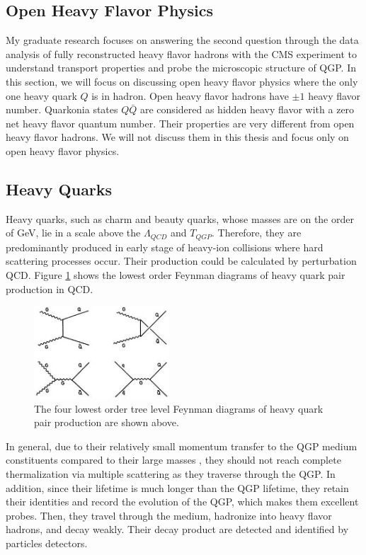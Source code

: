 \subsection{Open Heavy Flavor Physics}

My graduate research focuses on answering the second question through the data analysis of fully reconstructed heavy flavor hadrons with the CMS experiment to understand transport properties and probe the microscopic structure of QGP. In this section, we will focus on discussing open heavy flavor physics where the only one heavy quark $Q$ is in hadron. Open heavy flavor hadrons have $\pm 1$ heavy flavor number. Quarkonia states $Q\bar Q$ are considered as hidden heavy flavor with a zero net heavy flavor quantum number. Their properties are very different from open heavy flavor hadrons. We will not discuss them in this thesis and focus only on open heavy flavor physics. 

\subsection{Heavy Quarks}

Heavy quarks, such as charm and beauty quarks, whose masses are on the order of GeV, lie in a scale above the $\Lambda_{QCD}$ and $T_{QGP}$. Therefore, they are predominantly produced in early stage of heavy-ion collisions where hard scattering processes occur. Their production could be calculated by perturbation QCD. Figure \ref{HQProduce} shows the lowest order Feynman diagrams of heavy quark pair production in QCD. 

 \begin{figure}[hbtp]
\begin{center}
\includegraphics[width=0.45\textwidth]{Figures/Chapter1/HQDiagram.jpg}
\caption{The four lowest order tree level Feynman diagrams of heavy quark pair production are shown above.}
\label{HQProduce}
\end{center}
\end{figure}   

In general, due to their relatively small momentum transfer to the QGP medium constituents compared to their large masses \cite{HQReview}, they should not reach complete thermalization via multiple scattering as they traverse through the QGP. In addition, since their lifetime is much longer than the QGP lifetime, they retain their identities and record the evolution of the QGP, which makes them excellent probes. Then, they travel through the medium, hadronize into heavy flavor hadrons, and decay weakly. Their decay product are detected and identified by particles detectors.

